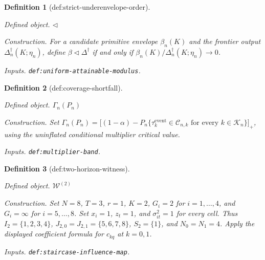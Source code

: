 \documentclass{article}
\newtheorem{definition}{Definition}
\begin{document}
\begin{definition}[def:strict-underenvelope-order]\label{def:strict-underenvelope-order}
\par\smallskip\noindent\emph{Defined object.} \(\triangleleft\)
\par\smallskip\noindent\emph{Construction.} For a candidate primitive envelope \(\beta_n(K)\) and the frontier output \(\Delta_n^{\dagger}(K;\eta_n)\), define \(\beta\triangleleft\Delta^{\dagger}\) if and only if \(\beta_n(K)/\Delta_n^{\dagger}(K;\eta_n)\to0\).
\par\smallskip\noindent\emph{Inputs.} \texttt{def:\allowbreak{}uniform-\allowbreak{}attainable-\allowbreak{}modulus}.
\end{definition}

\begin{definition}[def:coverage-shortfall]\label{def:coverage-shortfall}
\par\smallskip\noindent\emph{Defined object.} \(\Gamma_n(P_n)\)
\par\smallskip\noindent\emph{Construction.} Set \(\Gamma_n(P_n)=\bigl[(1-\alpha)-P_n\{\tau_k^{\mathrm{event}}\in\mathcal C_{n,k}\text{ for every }k\in\mathcal K_n\}\bigr]_+\), using the uninflated conditional multiplier critical value.
\par\smallskip\noindent\emph{Inputs.} \texttt{def:\allowbreak{}multiplier-\allowbreak{}band}.
\end{definition}

\begin{definition}[def:two-horizon-witness]\label{def:two-horizon-witness}
\par\smallskip\noindent\emph{Defined object.} \(\mathcal W^{(2)}\)
\par\smallskip\noindent\emph{Construction.} Set \(N=8\), \(T=3\), \(r=1\), \(K=2\), \(G_i=2\) for \(i=1,\ldots,4\), and \(G_i=\infty\) for \(i=5,\ldots,8\). Set \(x_i=1\), \(z_t=1\), and \(\sigma_{it}^2=1\) for every cell. Thus \(I_2=\{1,2,3,4\}\), \(J_{2,0}=J_{2,1}=\{5,6,7,8\}\), \(S_2=\{1\}\), and \(N_0=N_1=4\). Apply the displayed coefficient formula for \(c_{kq}\) at \(k=0,1\).
\par\smallskip\noindent\emph{Inputs.} \texttt{def:\allowbreak{}staircase-\allowbreak{}influence-\allowbreak{}map}.
\end{definition}
\end{document}
